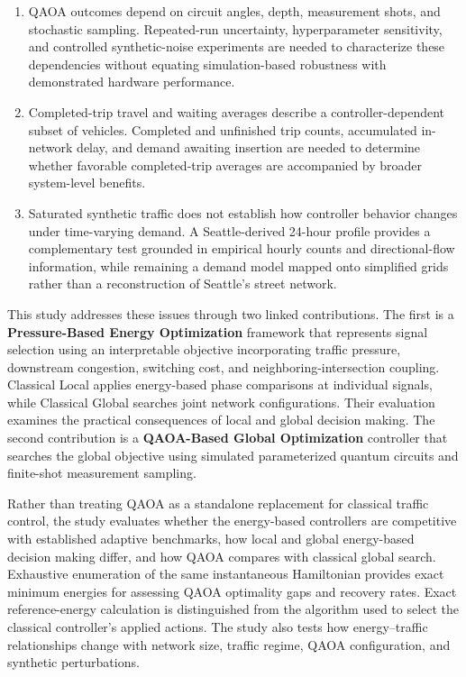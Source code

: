 \begin{enumerate}
\item QAOA outcomes depend on circuit angles, depth, measurement shots, and stochastic sampling. Repeated-run uncertainty, hyperparameter sensitivity, and controlled synthetic-noise experiments are needed to characterize these dependencies without equating simulation-based robustness with demonstrated hardware performance.

\item Completed-trip travel and waiting averages describe a controller-dependent subset of vehicles. Completed and unfinished trip counts, accumulated in-network delay, and demand awaiting insertion are needed to determine whether favorable completed-trip averages are accompanied by broader system-level benefits.

\item Saturated synthetic traffic does not establish how controller behavior changes under time-varying demand. A Seattle-derived 24-hour profile provides a complementary test grounded in empirical hourly counts and directional-flow information, while remaining a demand model mapped onto simplified grids rather than a reconstruction of Seattle's street network.
\end{enumerate}

This study addresses these issues through two linked contributions. The first is a \textbf{Pressure-Based Energy Optimization} framework that represents signal selection using an interpretable objective incorporating traffic pressure, downstream congestion, switching cost, and neighboring-intersection coupling. Classical Local applies energy-based phase comparisons at individual signals, while Classical Global searches joint network configurations. Their evaluation examines the practical consequences of local and global decision making. The second contribution is a \textbf{QAOA-Based Global Optimization} controller that searches the global objective using simulated parameterized quantum circuits and finite-shot measurement sampling.

Rather than treating QAOA as a standalone replacement for classical traffic control, the study evaluates whether the energy-based controllers are competitive with established adaptive benchmarks, how local and global energy-based decision making differ, and how QAOA compares with classical global search. Exhaustive enumeration of the same instantaneous Hamiltonian provides exact minimum energies for assessing QAOA optimality gaps and recovery rates. Exact reference-energy calculation is distinguished from the algorithm used to select the classical controller's applied actions. The study also tests how energy--traffic relationships change with network size, traffic regime, QAOA configuration, and synthetic perturbations.

